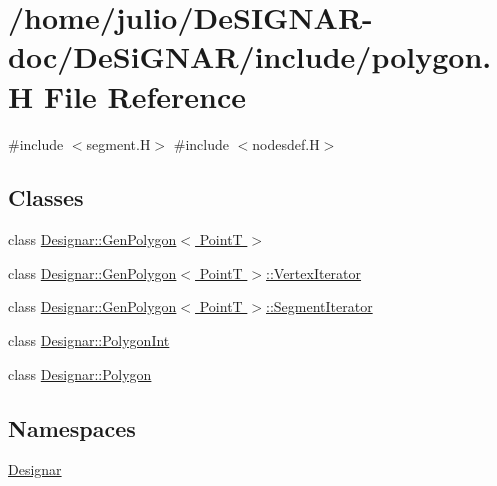 \hypertarget{polygon_8_h}{}\section{/home/julio/\+De\+S\+I\+G\+N\+A\+R-\/doc/\+De\+Si\+G\+N\+A\+R/include/polygon.H File Reference}
\label{polygon_8_h}
{\ttfamily \#include $<$segment.\+H$>$}\newline
{\ttfamily \#include $<$nodesdef.\+H$>$}\newline
\subsection*{Classes}
\begin{DoxyCompactItemize}
\item 
class \hyperlink{class_designar_1_1_gen_polygon}{Designar\+::\+Gen\+Polygon$<$ Point\+T $>$}
\item 
class \hyperlink{class_designar_1_1_gen_polygon_1_1_vertex_iterator}{Designar\+::\+Gen\+Polygon$<$ Point\+T $>$\+::\+Vertex\+Iterator}
\item 
class \hyperlink{class_designar_1_1_gen_polygon_1_1_segment_iterator}{Designar\+::\+Gen\+Polygon$<$ Point\+T $>$\+::\+Segment\+Iterator}
\item 
class \hyperlink{class_designar_1_1_polygon_int}{Designar\+::\+Polygon\+Int}
\item 
class \hyperlink{class_designar_1_1_polygon}{Designar\+::\+Polygon}
\end{DoxyCompactItemize}
\subsection*{Namespaces}
\begin{DoxyCompactItemize}
\item 
 \hyperlink{namespace_designar}{Designar}
\end{DoxyCompactItemize}
